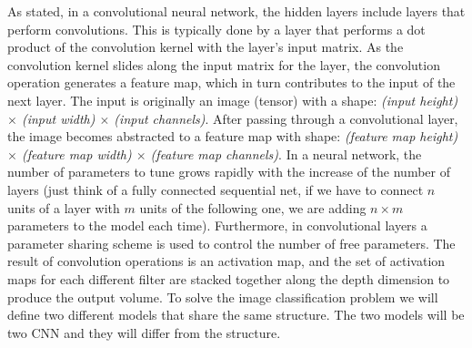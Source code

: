 As stated, in a convolutional neural network, the hidden layers include layers that perform convolutions. This is typically done by a layer that performs a dot product of the convolution kernel with the layer’s input matrix. As the convolution kernel slides along the input matrix for the layer, the convolution operation generates a feature map, which in turn contributes to the input of the next layer. The input is originally an image (tensor) with a shape: \textit{(input height) $\times$ (input width) $\times$ (input channels)}. After passing through a convolutional layer, the image becomes abstracted to a feature map with shape: \textit{(feature map height) $\times$ (feature map width) $\times$ (feature map channels)}. In a neural network, the number of parameters to tune grows rapidly with the increase of the number of layers (just think of a fully connected sequential net, if we have to connect $n$ units of a layer with $m$ units of the following one, we are adding $n \times m$ parameters to the model each time). Furthermore, in convolutional layers a parameter sharing scheme is used to control the number of free parameters. The result of convolution operations is an activation map, and the set of activation maps for each different filter are stacked together along the depth dimension to produce the output volume. To solve the image classification problem we will define two different models that share the same structure. The two models will be two CNN and they will differ from the structure.

